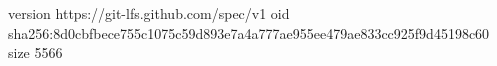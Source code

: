 version https://git-lfs.github.com/spec/v1
oid sha256:8d0cbfbece755c1075c59d893e7a4a777ae955ee479ae833cc925f9d45198c60
size 5566
